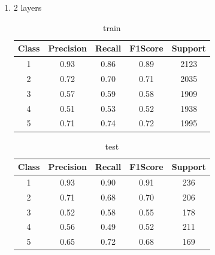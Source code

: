 \begin{enumerate}[label=(\alph*)]
\begin{enumerate}[label=\roman*.]
\begin{table}[!htb]
                        \label{part c test depth 1}
                    \end{table}
              \item 2 layers
                    \begin{table}[!htb]
                        \centering
                        \begin{tabular}{ccccc}
                            \hline
                            Class & Precision & Recall & F1Score & Support \\ \hline
                            1     & 0.93      & 0.86   & 0.89    & 2123    \\
                            2     & 0.72      & 0.70   & 0.71    & 2035    \\
                            3     & 0.57      & 0.59   & 0.58    & 1909    \\
                            4     & 0.51      & 0.53   & 0.52    & 1938    \\
                            5     & 0.71      & 0.74   & 0.72    & 1995    \\ \hline
                        \end{tabular}
                        \caption{train}
                        \label{part c train depth 2}
                    \end{table}
                    \begin{table}[!htb]
                        \centering
                        \begin{tabular}{ccccc}
                            \hline
                            Class & Precision & Recall & F1Score & Support \\ \hline
                            1     & 0.93      & 0.90   & 0.91    & 236     \\
                            2     & 0.71      & 0.68   & 0.70    & 206     \\
                            3     & 0.52      & 0.58   & 0.55    & 178     \\
                            4     & 0.56      & 0.49   & 0.52    & 211     \\
                            5     & 0.65      & 0.72   & 0.68    & 169     \\ \hline
                        \end{tabular}
                        \caption{test}
                        \label{part c test depth 2}
                    \end{table}
                    \newpage

\end{enumerate}
\end{enumerate}
